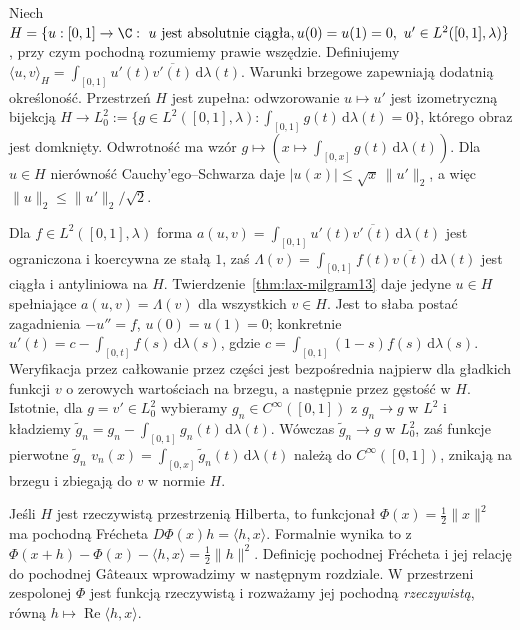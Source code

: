 \begin{przyklad}
\label{ex:weak-poisson13}
Niech $H=\{u:[0,1]\to\C:\ u\text{ jest absolutnie ciągła},
u(0)=u(1)=0,\ u'\in L^2([0,1],\lambda)\}$,
przy czym pochodną rozumiemy prawie wszędzie.
Definiujemy $\langle u,v\rangle_H=
\int_{[0,1]}u'(t)\overline{v'(t)}\,\mathrm d\lambda(t)$.
Warunki brzegowe zapewniają dodatnią określoność. Przestrzeń $H$
jest zupełna: odwzorowanie $u\mapsto u'$ jest izometryczną bijekcją
$H\to L^2_0:=\{g\in L^2([0,1],\lambda):
\int_{[0,1]}g(t)\,\mathrm d\lambda(t)=0\}$,
którego obraz jest domknięty. Odwrotność ma wzór
$g\mapsto(x\mapsto\int_{[0,x]}g(t)\,\mathrm d\lambda(t))$.
Dla $u\in H$ nierówność Cauchy'ego--Schwarza daje
$|u(x)|\le\sqrt{x}\,\|u'\|_2$, a więc
$\|u\|_2\le\|u'\|_2/\sqrt2$.

Dla $f\in L^2([0,1],\lambda)$ forma
$a(u,v)=\int_{[0,1]}u'(t)\overline{v'(t)}\,\mathrm d\lambda(t)$
jest ograniczona i koercywna ze stałą $1$, zaś
$\Lambda(v)=\int_{[0,1]}f(t)\overline{v(t)}\,\mathrm d\lambda(t)$
jest ciągła i antyliniowa na $H$.
Twierdzenie~\ref{thm:lax-milgram13} daje jedyne $u\in H$
spełniające $a(u,v)=\Lambda(v)$ dla wszystkich $v\in H$.
Jest to słaba postać zagadnienia $-u''=f$, $u(0)=u(1)=0$;
konkretnie $u'(t)=c-\int_{[0,t]}f(s)\,\mathrm d\lambda(s)$,
gdzie $c=\int_{[0,1]}(1-s)f(s)\,\mathrm d\lambda(s)$.
Weryfikacja przez całkowanie przez części jest bezpośrednia
najpierw dla gładkich funkcji $v$ o zerowych wartościach na brzegu,
a następnie przez gęstość w $H$. Istotnie, dla $g=v'\in L^2_0$
wybieramy $g_n\in C^\infty([0,1])$ z $g_n\to g$ w $L^2$
i kładziemy $\widetilde g_n=g_n-\int_{[0,1]}g_n(t)\,\mathrm d\lambda(t)$.
Wówczas $\widetilde g_n\to g$ w $L^2_0$, zaś funkcje
pierwotne $\widetilde g_n$ $v_n(x)=\int_{[0,x]}\widetilde g_n(t)\,\mathrm d\lambda(t)$
należą do $C^\infty([0,1])$, znikają na brzegu i zbiegają do $v$
w normie $H$.
\end{przyklad}

\begin{uwaga}
\label{rem:gateaux-bridge13}
Jeśli $H$ jest rzeczywistą przestrzenią Hilberta, to funkcjonał
$\Phi(x)=\frac12\|x\|^2$ ma pochodną Frécheta
$D\Phi(x)h=\langle h,x\rangle$. Formalnie wynika to z
$\Phi(x+h)-\Phi(x)-\langle h,x\rangle=\frac12\|h\|^2$.
Definicję pochodnej Frécheta i jej relację do pochodnej Gâteaux
wprowadzimy w następnym rozdziale. W przestrzeni zespolonej
$\Phi$ jest funkcją rzeczywistą i rozważamy jej pochodną
\emph{rzeczywistą}, równą $h\mapsto\operatorname{Re}\langle h,x\rangle$.
\end{uwaga}
